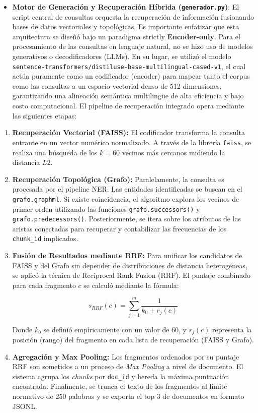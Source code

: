 \documentclass[12pt,a4paper]{article}
\begin{document}
\begin{itemize}
    \item \textbf{Motor de Generación y Recuperación Híbrida (\texttt{generador.py})}: 
    El script central de consultas orquesta la recuperación de información fusionando bases de datos vectoriales y topológicas. Es importante enfatizar que esta arquitectura se diseñó bajo un paradigma strictly \textbf{Encoder-only}. Para el procesamiento de las consultas en lenguaje natural, no se hizo uso de modelos generativos o decodificadores (LLMs). En su lugar, se utilizó el modelo \texttt{sentence-transformers/distiluse-base-multilingual-cased-v1}, el cual actúa puramente como un codificador (encoder) para mapear tanto el corpus como las consultas a un espacio vectorial denso de 512 dimensiones, garantizando una alineación semántica multilingüe de alta eficiencia y bajo costo computacional.
    El pipeline de recuperación integrado opera mediante las siguientes etapas:
\end{itemize}

\begin{enumerate}
    \item \textbf{Recuperación Vectorial (FAISS):} El codificador transforma la consulta entrante en un vector numérico normalizado. A través de la librería \texttt{faiss}, se realiza una búsqueda de los $k=60$ vecinos más cercanos midiendo la distancia $L2$.
    \item \textbf{Recuperación Topológica (Grafo):} Paralelamente, la consulta es procesada por el pipeline NER. Las entidades identificadas se buscan en el \texttt{grafo.graphml}. Si existe coincidencia, el algoritmo explora los vecinos de primer orden utilizando las funciones \texttt{grafo.successors()} y \texttt{grafo.predecessors()}. Posteriormente, se itera sobre los atributos de las aristas conectadas para recuperar y contabilizar las frecuencias de los \texttt{chunk\_id} implicados.
    \item \textbf{Fusión de Resultados mediante RRF:} Para unificar los candidatos de FAISS y del Grafo sin depender de distribuciones de distancia heterogéneas, se aplicó la técnica de Reciprocal Rank Fusion (RRF). El puntaje combinado para cada fragmento $c$ se calculó mediante la fórmula:
    
    $$s_{RRF}(c)=\sum_{j=1}^{m}\frac{1}{k_{0}+r_{j}(c)}$$
    
    Donde $k_{0}$ se definió empíricamente con un valor de 60, y $r_{j}(c)$ representa la posición (rango) del fragmento en cada lista de recuperación (FAISS y Grafo).
    \item \textbf{Agregación y Max Pooling:} Los fragmentos ordenados por su puntaje RRF son sometidos a un proceso de \textit{Max Pooling} a nivel de documento. El sistema agrupa los \textit{chunks} por \texttt{doc\_id} y hereda la máxima puntuación encontrada. Finalmente, se trunca el texto de los fragmentos al límite normativo de 250 palabras y se exporta el top 3 de documentos en formato JSONL.
\end{enumerate}
\end{document}
